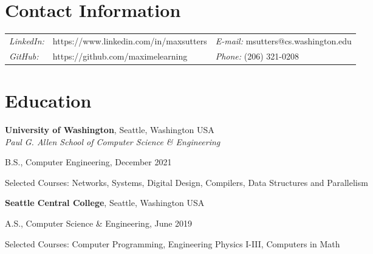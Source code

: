\documentclass[margin,line]{res}
\newenvironment{list1}{
  \begin{list}{\ding{113}}{%
      \setlength{\itemsep}{0in}
      \setlength{\parsep}{0in} \setlength{\parskip}{0in}
      \setlength{\topsep}{0in} \setlength{\partopsep}{0in} 
      \setlength{\leftmargin}{0.17in}}}{\end{list}}
\begin{document}
\thispagestyle{empty}


\begin{resume}
\section{\sc Contact Information}
\vspace{.05in}
\begin{tabular}{@{}p{0.5in}p{2.5in}p{3in}}
{\it LinkedIn:} & https://www.linkedin.com/in/maxsutters & {\it E-mail:}  msutters@cs.washington.edu \\   
{\it GitHub:} & https://github.com/maximelearning & {\it Phone:} (206) 321-0208 \\
\end{tabular}
%
%
\section{\sc Education}

{\bf University of Washington}, Seattle, Washington USA\\
{\em Paul G. Allen School of Computer Science \& Engineering} \\
\begin{list1}
\item[] B.S., Computer Engineering, December 2021
\item[] Selected Courses: Networks, Systems, Digital Design, Compilers, Data Structures and Parallelism
\end{list1}

{\bf Seattle Central College}, Seattle, Washington USA %
\\

\begin{list1}
\item[] A.S., Computer Science \& Engineering, June 2019
\item[] Selected Courses: Computer Programming, Engineering Physics I-III, Computers in Math
\end{list1}


\end{resume}
\end{document}
